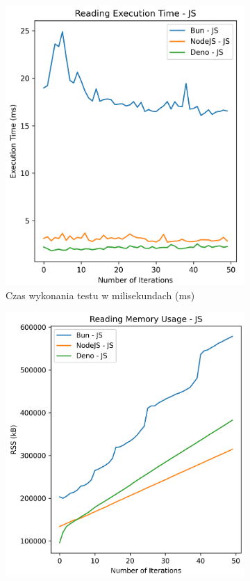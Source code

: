 \begin{figure}[H]
  \centering
  \begin{subfigure}[b]{0.42\textwidth}
    \centering
    \includegraphics[width=\textwidth]{Figures/files/files_writing_50_500_50_js_time.png}
    \caption{Czas wykonania testu w milisekundach (ms)}
    \label{fig:file_e1_writing_js_time}
  \end{subfigure}
  \begin{subfigure}[b]{0.42\textwidth}
    \centering
    \includegraphics[width=\textwidth]{Figures/files/files_writing_50_500_50_js_memory.png}

\end{subfigure}
\end{figure}
